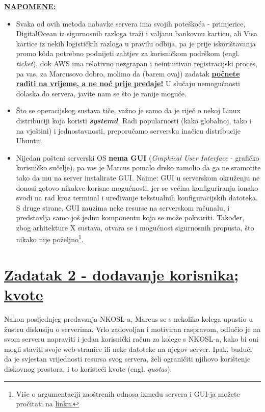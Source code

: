 \documentclass[12pt,a4paper]{article}
\begin{document}
  	\textbf{\underline{NAPOMENE:}}
  	\begin{itemize}
  		\item Svaka od ovih metoda nabavke servera ima svojih poteškoća - primjerice, DigitalOcean iz sigurnosnih razloga traži i valjanu bankovnu karticu, ali Visa kartice iz nekih logističkih razloga u pravilu odbija, pa je prije iskorištavanja promo kôda potrebno podnijeti zahtjev za korisničkom podrškom (engl. \textit{ticket}), dok AWS ima relativno nezgrapan i neintuitivan registracijski proces, pa vas, za Marcusovo dobro, molimo da (barem ovaj) zadatak \textbf{\underline{počnete raditi na vrijeme, a ne noć prije predaje!}} U slučaju nemogućnosti dolaska do servera, javite nam se što je ranije moguće.
  		\item Što se operacijskog sustava tiče, važno je samo da je riječ o nekoj Linux distribuciji koja koristi \textbf{\textit{systemd}}. Radi popularnosti (kako globalnoj, tako i na vještini) i jednostavnosti, preporučamo serversku inačicu distribucije Ubuntu. 
  		\item Nijedan pošteni serverski OS \textbf{nema GUI} (\textit{Graphical User Interface} - grafičko korisničko sučelje), pa vas je Marcus pomalo drsko zamolio da ga ne sramotite tako da mu na server instalirate GUI. Naime: GUI u serverskom okruženju ne donosi gotovo nikakve korisne mogućnosti, jer se većina konfiguriranja ionako svodi na rad kroz terminal i uređivanje tekstualnih konfiguracijskih datoteka. S druge strane, GUI zauzima neke resurse na serverskom računalu, i predstavlja samo još jednu komponentu koja se može pokvariti. Također, zbog arhitekture X sustava, otvara se i mogućnost sigurnosnih propusta, što nikako nije poželjno\footnote{Više o argumentaciji zaoštrenih odnosa između servera i GUI-ja možete pročitati na \href{https://help.ubuntu.com/community/ServerGUI}{linku.}}.
  	\end{itemize}

  	\newpage

	\section*{\underline{Zadatak 2 - dodavanje korisnika; kvote}}
		Nakon posljednjeg predavanja NKOSL-a, Marcus se s nekoliko kolega upustio u žustru diskusiju o serverima. Vrlo zadovoljan i motiviran raspravom, odlučio je na svom serveru napraviti i jedan korisnički račun za kolege s NKOSL-a, kako bi oni mogli staviti svoje web-stranice ili neke datoteke na njegov server. Ipak, budući da je svjestan vrijednosti resursa svog servera, želi ograničiti njihovo korištenje diskovnog prostora, i to koristeći kvote (engl. \textit{quotas}).
\end{document}

